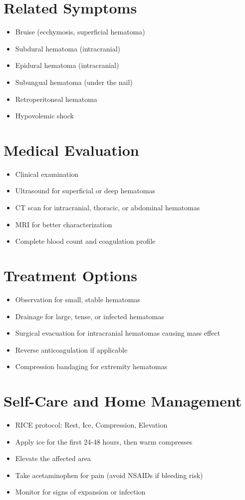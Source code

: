 \section*{Related Symptoms}
\begin{itemize}
\item Bruise (ecchymosis, superficial hematoma)
\item Subdural hematoma (intracranial)
\item Epidural hematoma (intracranial)
\item Subungual hematoma (under the nail)
\item Retroperitoneal hematoma
\item Hypovolemic shock
\end{itemize}

\section*{Medical Evaluation}
\begin{itemize}
\item Clinical examination
\item Ultrasound for superficial or deep hematomas
\item CT scan for intracranial, thoracic, or abdominal hematomas
\item MRI for better characterization
\item Complete blood count and coagulation profile
\end{itemize}

\section*{Treatment Options}
\begin{itemize}
\item Observation for small, stable hematomas
\item Drainage for large, tense, or infected hematomas
\item Surgical evacuation for intracranial hematomas causing mass effect
\item Reverse anticoagulation if applicable
\item Compression bandaging for extremity hematomas
\end{itemize}
\section*{Self-Care and Home Management}
\begin{itemize}
\item RICE protocol: Rest, Ice, Compression, Elevation
\item Apply ice for the first 24-48 hours, then warm compresses
\item Elevate the affected area
\item Take acetaminophen for pain (avoid NSAIDs if bleeding risk)
\item Monitor for signs of expansion or infection
\end{itemize}


